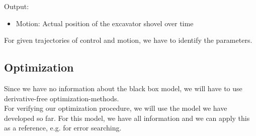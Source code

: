 \documentclass{article}
\begin{document}
Output:

\begin{itemize}
	\item{Motion: Actual position of the excavator shovel over time}
\end{itemize}

For given trajectories of control and motion, we have to identify the parameters.

\subsection{Optimization}

Since we have no information about the black box model, we will have to use derivative-free optimization-methods. \\

For verifying our optimization procedure, we will use the model we have developed so far. For this model, we have all information and we can apply this as a reference, e.g. for error searching.
\end{document}
